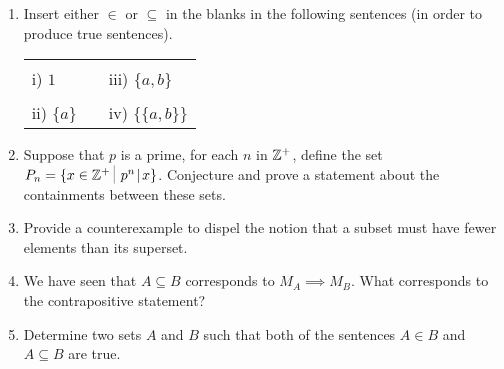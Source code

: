 \begin{enumerate}
\item Insert either $\in$ or $\subseteq$ in the blanks in the following 
sentences (in order to produce true sentences).


\begin{tabular}{lcl}
\rule{0pt}{16pt}i) $1$ \underline{\rule{36pt}{0pt}} $\{3, 2, 1, \{a, b\}\}$ & \rule{36pt}{0pt} & iii) $\{a, b\}$  \underline{\rule{36pt}{0pt}} $\{3, 2, 1, \{a, b\}\}$ \\
\rule{0pt}{16pt}ii) $\{a\}$ \underline{\rule{36pt}{0pt}} $\{a, \{a, b\}\}$ & &
iv) $\{\{a, b\}\}$  \underline{\rule{36pt}{0pt}} $\{a, \{a, b\}\}$ \\
\end{tabular}

\hint{$\in$, $\subseteq$, $\in$, $\subseteq$}

\item  Suppose that $p$ is a prime, for each $n$ in ${\mathbb Z}^+$, 
define the set $P_n = \{ x \in \Integers^+ \suchthat \, p^n \divides x \}$.  
Conjecture and prove a statement about the containments between these sets.


\wbvfill

\item  Provide a counterexample to dispel the notion that a subset must
have fewer elements than its superset.


\wbvfill

\workbookpagebreak

\item  We have seen that $A \subseteq B$ corresponds to $M_A \implies M_B$.
What corresponds to the contrapositive statement?

 
\wbvfill

\item Determine two sets $A$ and $B$ such that both of the sentences
$A \in B$ and $A \subseteq B$ are true.


\end{enumerate}
